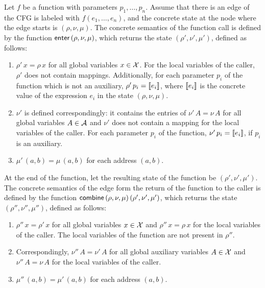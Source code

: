 Let $f$ be a function with parameters $p_1, \ldots, p_n$.
Assume that there is an edge of the CFG is labeled with $f(e_1, \ldots, e_n)$,
and the concrete state at the node where the edge starts is $(\rho, \nu, \mu)$.
The concrete semantics of the
function call is defined by the function $\textsf{enter}\,(\rho, \nu, \mu)$, which returns the state $(\rho', \nu', \mu')$, defined as follows:
\begin{enumerate}
    \item $\rho'\,x = \rho\,x$ for all global variables $x \in \mathcal{X}$.
    For the local variables of the caller, $\rho'$ does not contain mappings.
          Additionally, for each parameter $p_i$ of the function which is not an auxiliary, $\rho'\,p_i = \llbracket e_i\rrbracket$, where $\llbracket e_i\rrbracket$ is the concrete value of the expression $e_i$ in the state $(\rho, \nu, \mu)$.
    \item $\nu'$ is defined correspondingly: it contains the entries of $\nu'\,A = \nu\,A$ for all global variables $A \in \mathcal{A}$ and $\nu'$ does not contain a mapping for the local variables of the caller.
    For each parameter $p_i$ of the function, $\nu'\,p_i=\llbracket e_i\rrbracket$, if $p_i$ is an auxiliary.
    \item $\mu'\,(a,b)=\mu\,(a,b)$ for each address $(a,b)$.
\end{enumerate}

At the end of the function, let the resulting state of the function be $(\rho', \nu', \mu')$.
The concrete semantics of the edge form the return of the function to the caller is defined by the function $\textsf{combine}\,(\rho, \nu, \mu)\,(\rho', \nu', \mu')$, which returns the state $(\rho'', \nu'', \mu'')$, defined as follows:
\begin{enumerate}
    \item $\rho''\,x = \rho'\,x$ for all global variables $x \in \mathcal{X}$ and $\rho''\,x = \rho\,x$ for the local variables of the caller.
    The local variables of the function are not present in $\rho''$.
    \item Correspondingly, $\nu''\,A = \nu'\,A$ for all global auxiliary variables $A \in \mathcal{X}$ and $\nu''\,A = \nu\,A$ for the local variables of the caller.
    \item $\mu''\,(a,b)=\mu'\,(a,b)$ for each address $(a,b)$.
\end{enumerate}

